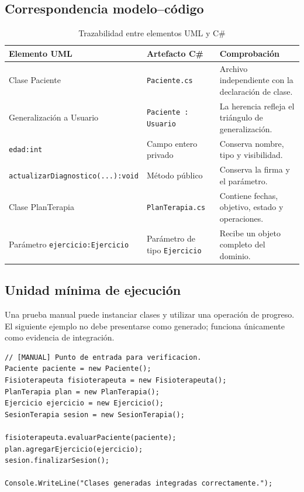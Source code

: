 \subsection{Correspondencia modelo--código}
\begin{table}[H]
\centering
\caption{Trazabilidad entre elementos UML y C\#}
\begin{tabularx}{\textwidth}{L{4cm}L{5.2cm}X}
\toprule
\textbf{Elemento UML} & \textbf{Artefacto C\#} & \textbf{Comprobación} \\
\midrule
Clase Paciente & \texttt{Paciente.cs} & Archivo independiente con la declaración de clase. \\
Generalización a Usuario & \texttt{Paciente : Usuario} & La herencia refleja el triángulo de generalización. \\
\texttt{edad:int} & Campo entero privado & Conserva nombre, tipo y visibilidad. \\
\texttt{actualizarDiagnostico(...):void} & Método público & Conserva la firma y el parámetro. \\
Clase PlanTerapia & \texttt{PlanTerapia.cs} & Contiene fechas, objetivo, estado y operaciones. \\
Parámetro \texttt{ejercicio:Ejercicio} & Parámetro de tipo \texttt{Ejercicio} & Recibe un objeto completo del dominio. \\
\bottomrule
\end{tabularx}
\end{table}

\subsection{Unidad mínima de ejecución}
Una prueba manual puede instanciar clases y utilizar una operación de progreso. El siguiente ejemplo no debe presentarse como generado; funciona únicamente como evidencia de integración.

\begin{lstlisting}[caption={Unidad manual mínima para probar las clases generadas}]
// [MANUAL] Punto de entrada para verificacion.
Paciente paciente = new Paciente();
Fisioterapeuta fisioterapeuta = new Fisioterapeuta();
PlanTerapia plan = new PlanTerapia();
Ejercicio ejercicio = new Ejercicio();
SesionTerapia sesion = new SesionTerapia();

fisioterapeuta.evaluarPaciente(paciente);
plan.agregarEjercicio(ejercicio);
sesion.finalizarSesion();

Console.WriteLine("Clases generadas integradas correctamente.");
\end{lstlisting}

